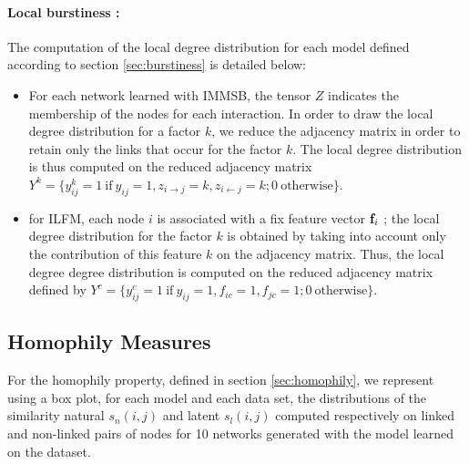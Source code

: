 \paragraph{Local burstiness : }
The computation of the local degree distribution for each model defined according to section \ref{sec:burstiness} is detailed below: 
\begin{itemize}
    \item For each network learned with IMMSB, the tensor $Z$ indicates the membership of the nodes for each  interaction. In order to draw the local degree distribution for a factor $k$, we reduce the adjacency matrix in order to retain only the links that occur for the factor $k$. The local degree distribution is thus computed on the reduced adjacency matrix  $Y^k =\{ y_{ij}^k=1 \ \textrm{if}\ y_{ij}=1 , z_{i\rightarrow j}=k, z_{i\leftarrow j}=k; 0 \ \textrm{otherwise} \}$.
        \item for ILFM, each node $i$ is associated with a fix feature vector $\mathbf{f}_{i}$ ; the local degree distribution for the factor $k$ is obtained by taking into account only the contribution of this feature $k$ on the adjacency matrix. Thus, the local degree degree distribution is computed on the reduced adjacency matrix defined by $Y^c =\{ y_{ij}^c=1 \ \textrm{if}\ y_{ij}=1 , f_{ic}=1, f_{jc}=1; 0 \ \textrm{otherwise}\}$.
\end{itemize}

\subsection{Homophily Measures}


For the homophily property, defined in section \ref{sec:homophily}, we represent using a box plot, for each model and each data set, the distributions of the similarity natural $s_n(i,j)$ and latent $s_l(i,j)$ computed respectively on linked and non-linked pairs of nodes for 10 networks generated with the model learned on the dataset.


